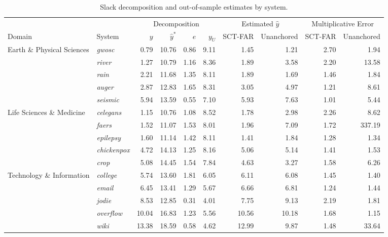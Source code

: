 \documentclass{article}
\begin{document}
\clearpage
\begin{table}[H]
\centering
\footnotesize
\captionsetup{position=top,skip=12pt}
\caption{Slack decomposition and out-of-sample estimates by system.}
\label{tab:si-estimates}
\setlength{\tabcolsep}{2pt}
\begin{tabularx}{\linewidth}{@{}Xlrrrrrrrr@{}}
\toprule
 & & \multicolumn{4}{c}{Decomposition} & \multicolumn{2}{c}{Estimated $\widehat{y}$} & \multicolumn{2}{c}{Multiplicative Error} \\
\cmidrule(lr){3-6}\cmidrule(lr){7-8}\cmidrule(l){9-10}
Domain & System & $y$ & $\widehat{y}^{*}$ & $e$ & $y_U$ & SCT-FAR & Unanchored & SCT-FAR & Unanchored \\
\midrule
Earth \& Physical Sciences & \textit{gwosc} & 0.79 & 10.76 & 0.86 & 9.11 & 1.45 & 1.21 & 2.70 & 1.94 \\
 & \textit{river} & 1.27 & 10.79 & 1.16 & 8.36 & 1.89 & 3.58 & 2.20 & 13.58 \\
 & \textit{rain} & 2.21 & 11.68 & 1.35 & 8.11 & 1.89 & 1.69 & 1.46 & 1.84 \\
 & \textit{auger} & 2.87 & 12.83 & 1.65 & 8.31 & 3.05 & 4.97 & 1.21 & 8.61 \\
 & \textit{seismic} & 5.94 & 13.59 & 0.55 & 7.10 & 5.93 & 7.63 & 1.01 & 5.44 \\
\addlinespace
Life Sciences \& Medicine & \textit{celegans} & 1.15 & 10.76 & 1.08 & 8.52 & 1.78 & 2.98 & 2.26 & 8.62 \\
 & \textit{faers} & 1.52 & 11.07 & 1.53 & 8.01 & 1.96 & 7.09 & 1.72 & 337.19 \\
 & \textit{epilepsy} & 1.60 & 11.14 & 1.42 & 8.11 & 1.41 & 1.84 & 1.28 & 1.34 \\
 & \textit{chickenpox} & 4.72 & 14.13 & 1.25 & 8.16 & 5.06 & 5.14 & 1.41 & 1.53 \\
 & \textit{crop} & 5.08 & 14.45 & 1.54 & 7.84 & 4.63 & 3.27 & 1.58 & 6.26 \\
\addlinespace
Technology \& Information & \textit{college} & 5.74 & 13.60 & 1.81 & 6.05 & 6.11 & 6.08 & 1.45 & 1.40 \\
 & \textit{email} & 6.45 & 13.41 & 1.29 & 5.67 & 6.66 & 6.81 & 1.24 & 1.44 \\
 & \textit{jodie} & 8.53 & 12.85 & 0.31 & 4.01 & 7.75 & 9.13 & 2.19 & 1.81 \\
 & \textit{overflow} & 10.04 & 16.83 & 1.23 & 5.56 & 10.56 & 10.18 & 1.68 & 1.15 \\
 & \textit{wiki} & 13.38 & 18.59 & 0.58 & 4.62 & 12.99 & 9.87 & 1.48 & 33.64 \\

\end{tabularx}
\end{table}
\end{document}

